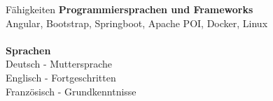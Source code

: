\documentclass{resume} %
\begin{document}
\begin{rSection}{Fähigkeiten}
{\bf Programmiersprachen und Frameworks }
\\Angular, Bootstrap, Springboot, Apache POI, Docker, Linux\\\\
{\bf Sprachen}
\\Deutsch - Muttersprache
\\Englisch - Fortgeschritten
\\Französisch - Grundkenntnisse
\end{rSection}




\end{document}
